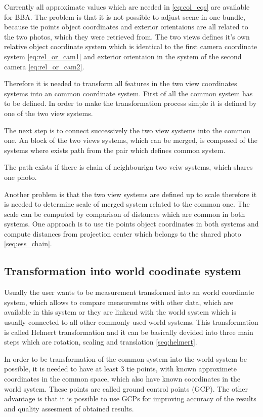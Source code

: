 \documentclass[a4paper,12pt]{report}
\begin{document}
Currently all approximate values which are needed in \eqref{eq:col_eqs} are available for BBA. 
The problem is that it is not possible to adjust scene in one bundle, because tie points
object coordinates and exterior orientaions are all related to the two photos, which they were 
retrieved from. The two views defines it's own relative object coordinate system which is identical
to the first camera coordinate system \eqref{eq:rel_or_cam1} and
exterior orientaion in the system of the second camera \eqref{eq:rel_or_cam2}.


Therefore it is needed to transform all features in the two view coordinates systems into 
an common coordinate system. First of all the common system has to be defined.
In order to make the transformation process simple it is defined by one of the two view
systems.

The next step is to connect successively the two view systems into the common one.  
An block of the two views systems, which can be merged, is composed of the systems 
where exists path from the pair which defines common system.

The path exists if there is chain of neighbourign two veiw systems, which 
shares one photo. 

Another problem is that the two view systems are defined up to scale therefore 
it is needed to determine scale of merged system related to the common one. 
The scale can be computed by comparison of distances which are common in both systems.
One approach is to use tie points object coordinates in both systems 
and compute distances from projection center which belongs to the shared photo \ref{seq:ess_chain}. 


\subsection{Transformation into world coodinate system}

Usually the user wants to be measurement transformed into an world coordinate system, which allows 
to compare measuremtns with other data, which are available in this system or they are 
linkend with the world system which is usually connected to all other commonly used  world systems. 
This transformation is called Helmert  transformation and it can be basically devided into 
three main steps which are rotation, scaling and translation \ref{seq:helmert}.

In order to be transformation of the common system into the world system be possible, it is needed 
to have at least 3 tie points, with known approximete coordinates in the common space, which also have 
known coordinates in the world system. These points are called ground control points (GCP). The other advantage is that it is possible to use GCPs for improving accuracy of the results and 
 quality assesment of obtained results.
 
\end{document}
